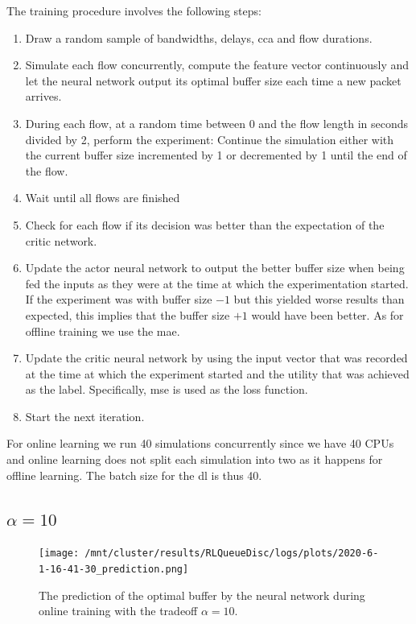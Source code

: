 \documentclass[conference]{IEEEtran}
\begin{document}
The training procedure involves the following steps:
\begin{enumerate}
\item Draw a random sample of bandwidths, delays, \gls{cca} and flow durations.
\item Simulate each flow concurrently, compute the feature vector continuously and let the neural network output its optimal buffer size each time a new packet arrives. 
\item During each flow, at a random time between 0 and the flow length in seconds divided by 2, perform the experiment: Continue the simulation either with the current buffer size incremented by 1 or decremented by 1 until the end of the flow. 
\item Wait until all flows are finished
\item Check for each flow if its decision was better than the expectation of the critic network.
\item Update the actor neural network to output the better buffer size when being fed the inputs as they were at the time at which the experimentation started. If the experiment was with buffer size $-1$ but this yielded worse results than expected, this implies that the buffer size $+1$ would have been better. As for offline training we use the \gls{mae}. 
\item Update the critic neural network by using the input vector that was recorded at the time at which the experiment started and the utility that was achieved as the label. Specifically, \gls{mse} is used as the loss function. 
\item Start the next iteration. 
\end{enumerate}

For online learning we run 40 simulations concurrently since we have 40 CPUs and online learning does not split each simulation into two as it happens for offline learning. The batch size for the \gls{dl} is thus 40. 

\subsection{$\alpha=10$}

\begin{figure}[h]
\texttt{[image: /mnt/cluster/results/RLQueueDisc/logs/plots/2020-6-1-16-41-30\_prediction.png]}
\caption{The prediction of the optimal buffer by the neural network during online training with the tradeoff $\alpha=10$.}
\label{fig:onlineTraining}
\end{figure}
\end{document}
